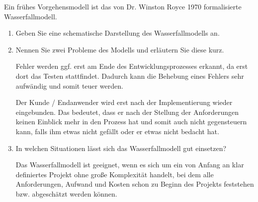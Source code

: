 \documentclass{bschlangaul-aufgabe}
\begin{document}
\noindent
Ein frühes Vorgehensmodell ist das von Dr. Winston Royce 1970
formalisierte Wasserfallmodell.

\begin{enumerate}


\item Geben Sie eine schematische Darstellung des
Wasserfallmodells an.

\begin{bAntwort}
\end{bAntwort}


\item Nennen Sie zwei Probleme des Modells und erläutern Sie diese kurz.

\begin{bAntwort}
Fehler werden ggf. erst am Ende des Entwicklungsprozesses erkannt, da
erst dort das Testen stattfindet. Dadurch kann die Behebung eines
Fehlers sehr aufwändig und somit teuer werden.

Der Kunde / Endanwender wird erst nach der Implementierung wieder
eingebunden. Das bedeutet, dass er nach der Stellung der Anforderungen
keinen Einblick mehr in den Prozess hat und somit auch nicht
gegensteuern kann, falls ihm etwas nicht gefällt oder er etwas nicht
bedacht hat.
\end{bAntwort}


\item In welchen Situationen lässt sich das Wasserfallmodell gut
einsetzen?

\begin{bAntwort}
Das Wasserfallmodell ist geeignet, wenn es sich um ein von Anfang an
klar definiertes Projekt ohne große Komplexität handelt, bei dem alle
Anforderungen, Aufwand und Kosten schon zu Beginn des Projekts
feststehen bzw. abgeschätzt werden können.
\end{bAntwort}

\end{enumerate}
\end{document}
